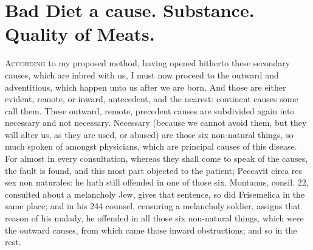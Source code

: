 {{\section[Bad Diet]{Bad Diet a cause. Substance. Quality of Meats.}\label{sec:bad-diet}

\lettrine{A}{ccording} to my proposed method, having opened hitherto these secondary
causes, which are inbred with us, I must now proceed to the outward and
adventitious, which happen unto us after we are born. And those are
either evident, remote, or inward, antecedent, and the nearest:
continent causes some call them. These outward, remote, precedent
causes are subdivided again into necessary and not necessary. Necessary
(because we cannot avoid them, but they will alter us, as they are
used, or abused) are those six non-natural things, so much spoken of
amongst physicians, which are principal causes of this disease. For
almost in every consultation, whereas they shall come to speak of the
causes, the fault is found, and this most part objected to the patient;
Peccavit circa res sex non naturales: he hath still offended in one of
those six. Montanus, consil. 22, consulted about a melancholy Jew,
gives that sentence, so did Frisemelica in the same place; and in his
244 counsel, censuring a melancholy soldier, assigns that reason of his
malady, he offended in all those six non-natural things, which
were the outward causes, from which came those inward obstructions; and
so in the rest.

}}
